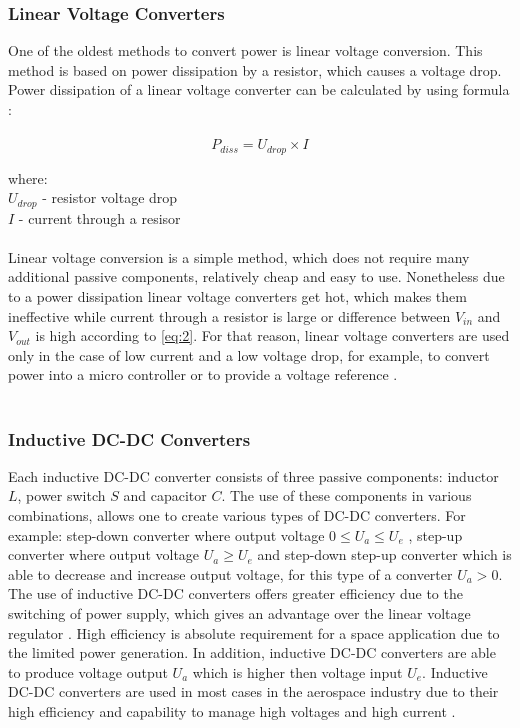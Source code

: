 \subsubsection{Linear Voltage Converters \label{sec:tech}}

 One of the oldest methods to convert power is linear voltage conversion. This method is based on power dissipation by a resistor, which causes a voltage drop. Power dissipation of a linear voltage converter can be calculated by using formula \cite{18}:\\ \\

\begin{equation}\label{eq:2}
P_{diss}=U_{drop} \times I
\end{equation}


where:\\
$U_{drop}$ - resistor voltage drop\\
$I$ - current through a resisor\\ \\
   Linear voltage conversion is a simple method, which does not require many additional passive components, relatively cheap and easy to use. Nonetheless due to a power dissipation linear voltage converters get hot, which makes them ineffective while current through a resistor is large or difference between $V_{in}$ and $V_{out}$ is high according to \eqref{eq:2}. For that reason, linear voltage converters are used only in the case of low current and a low voltage drop, for example, to convert power into a micro controller or to provide a voltage reference \cite{18}.\\
 \\
 
 
\subsubsection{Inductive DC-DC Converters \label{sec:tech}}

 Each inductive DC-DC converter consists of three passive components: inductor $L$, power switch $S$ and capacitor $C$. The use of these components in various combinations, allows one to create various types of DC-DC converters. For example: step-down converter where output voltage $0 \leq U_{a} \leq U_{e} $ , step-up converter where output voltage $U_{a} \geq U_{e} $  and   step-down step-up converter which is able to decrease and increase output voltage, for this type of a converter $ U_{a} > 0$. The use of inductive DC-DC converters offers greater efficiency due to the switching of power supply, which gives an advantage over the linear voltage regulator \cite{18}.  High efficiency is absolute requirement for a space application due to the limited power generation. In addition, inductive DC-DC converters are able to produce  voltage output $U_{a}$ which is higher then voltage input $U_{e}$. Inductive DC-DC converters are used in most cases in the aerospace industry due to their high efficiency and capability to manage high voltages and high current \cite{17}.

